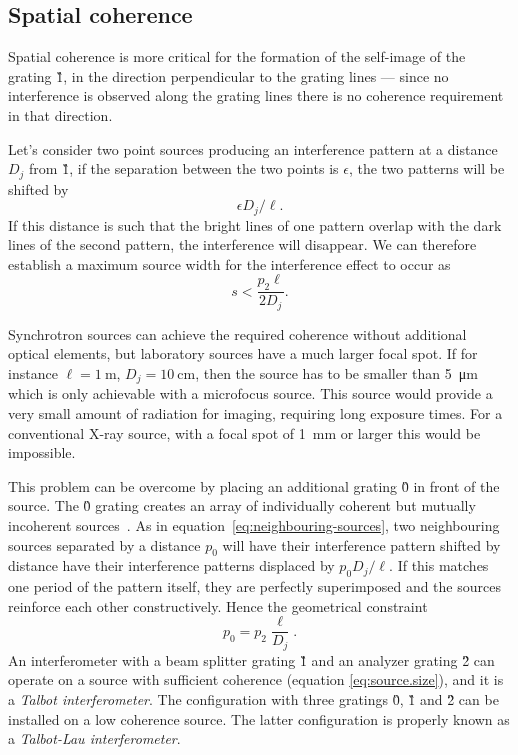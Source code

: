 \subsection{Spatial coherence}\label{sec:coherence}
Spatial coherence is more critical for the formation of the self-image of
the grating \G1, in the direction perpendicular to the grating lines --- since no
interference is observed along the grating lines there
is no coherence requirement in that direction.

Let's consider two point sources producing an interference pattern at a
distance $D_j$ from \G1, if the separation between the two points is
$\epsilon$, the two patterns will be shifted by 
\begin{equation}
    \epsilon D_j / \ell.
    \label{eq:neighbouring-sources}
\end{equation}
If this distance is such that the bright lines of one pattern
overlap with the dark lines of the second pattern, the interference will
disappear. We can therefore establish a maximum source width for the
interference effect to occur as
\begin{equation}
    s < \frac{p_2\ell}{2D_j}.
    \label{eq:source.size}
\end{equation}

Synchrotron sources can achieve the required coherence without additional
optical elements, but laboratory sources have a much larger focal spot. If
for instance $\ell = \SI{1}{\meter}$, $D_j = \SI{10}{\centi\meter}$, then
the source has to be smaller than \SI{5}{\micro\meter} which is only
achievable with a microfocus source. This source would provide a very small
amount of radiation for imaging, requiring long exposure times.
For a conventional X-ray source, with a focal spot of \SI{1}{\milli\meter}
or larger this would be impossible.

This problem can be overcome by placing an additional grating \G0 in front
of the source. The \G0 grating creates an array of individually coherent but
mutually incoherent sources~\parencite{Pfeiffer2006}. As in equation~\eqref{eq:neighbouring-sources},
two neighbouring sources separated by a distance $p_0$ will have their
interference pattern shifted by 
distance have their
interference patterns displaced by $p_0 D_j / \ell$. If this matches one
period of the pattern itself, they are perfectly superimposed and the
sources reinforce each other constructively. Hence the geometrical
constraint
\begin{equation}
    p_0 = p_2 \frac{\ell}{D_j}.\label{eq:p0}
\end{equation}
An interferometer with a beam splitter grating \G1 and an analyzer grating
\G2 can operate on a source with sufficient coherence (equation
\ref{eq:source.size}), and it is a \emph{Talbot interferometer}.
The configuration with three gratings \G0, \G1 and \G2 can be installed on a
low coherence source. The latter configuration is properly known as a
\emph{Talbot-Lau interferometer}.

